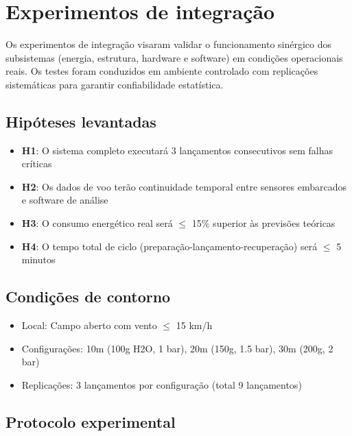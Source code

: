 \section{Experimentos de integração}

Os experimentos de integração visaram validar o funcionamento sinérgico dos subsistemas (energia, estrutura, hardware e software) em condições operacionais reais. Os testes foram conduzidos em ambiente controlado com replicações sistemáticas para garantir confiabilidade estatística.

\subsection{Hipóteses levantadas}
\begin{itemize}
    \item \textbf{H1}: O sistema completo executará 3 lançamentos consecutivos sem falhas críticas
    \item \textbf{H2}: Os dados de voo terão continuidade temporal entre sensores embarcados e software de análise
    \item \textbf{H3}: O consumo energético real será $\leq$ 15\% superior às previsões teóricas
    \item \textbf{H4}: O tempo total de ciclo (preparação-lançamento-recuperação) será $\leq$ 5 minutos
\end{itemize}

\subsection{Condições de contorno}
\begin{itemize}
    \item Local: Campo aberto com vento $\leq$ 15 km/h
    \item Configurações: 10m (100g H2O, 1 bar), 20m (150g, 1.5 bar), 30m (200g, 2 bar)
    \item Replicações: 3 lançamentos por configuração (total 9 lançamentos)
\end{itemize}

\subsection{Protocolo experimental}
